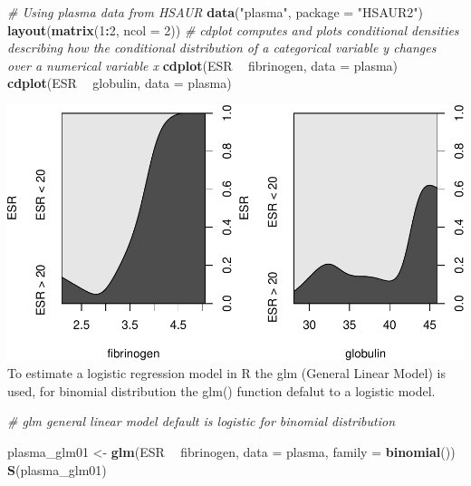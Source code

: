\documentclass[
]{article}
\newenvironment{Shaded}{\begin{snugshade}}{\end{snugshade}}
\newcommand{\CommentTok}[1]{\textcolor[rgb]{0.56,0.35,0.01}{\textit{#1}}}
\newcommand{\DataTypeTok}[1]{\textcolor[rgb]{0.13,0.29,0.53}{#1}}
\newcommand{\DecValTok}[1]{\textcolor[rgb]{0.00,0.00,0.81}{#1}}
\newcommand{\KeywordTok}[1]{\textcolor[rgb]{0.13,0.29,0.53}{\textbf{#1}}}
\newcommand{\NormalTok}[1]{#1}
\newcommand{\OperatorTok}[1]{\textcolor[rgb]{0.81,0.36,0.00}{\textbf{#1}}}
\newcommand{\StringTok}[1]{\textcolor[rgb]{0.31,0.60,0.02}{#1}}
\begin{document}
\begin{Shaded}
\begin{Highlighting}[]
\CommentTok{# Using plasma data from HSAUR}
\KeywordTok{data}\NormalTok{(}\StringTok{"plasma"}\NormalTok{, }\DataTypeTok{package =} \StringTok{"HSAUR2"}\NormalTok{)}
\KeywordTok{layout}\NormalTok{(}\KeywordTok{matrix}\NormalTok{(}\DecValTok{1}\OperatorTok{:}\DecValTok{2}\NormalTok{, }\DataTypeTok{ncol =} \DecValTok{2}\NormalTok{))}
\CommentTok{# cdplot computes and plots conditional densities describing how the conditional distribution of a categorical variable y changes over a numerical variable x}
\KeywordTok{cdplot}\NormalTok{(ESR }\OperatorTok{~}\StringTok{ }\NormalTok{fibrinogen, }\DataTypeTok{data =}\NormalTok{ plasma)}
\KeywordTok{cdplot}\NormalTok{(ESR }\OperatorTok{~}\StringTok{ }\NormalTok{globulin, }\DataTypeTok{data =}\NormalTok{ plasma)}
\end{Highlighting}
\end{Shaded}

\includegraphics{LogisticRegressionCh5_files/figure-latex/unnamed-chunk-2-1.pdf}
To estimate a logistic regression model in R the glm (General Linear
Model) is used, for binomial distribution the glm() function defalut to
a logistic model.

\begin{Shaded}
\begin{Highlighting}[]
\CommentTok{# glm general linear model default is logistic for binomial distribution}

\NormalTok{plasma_glm01 <-}\StringTok{ }\KeywordTok{glm}\NormalTok{(ESR }\OperatorTok{~}\StringTok{ }\NormalTok{fibrinogen, }\DataTypeTok{data =}\NormalTok{ plasma, }\DataTypeTok{family =} \KeywordTok{binomial}\NormalTok{())}
\KeywordTok{S}\NormalTok{(plasma_glm01)}
\end{Highlighting}
\end{Shaded}
\end{document}
